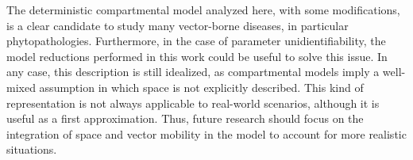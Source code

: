 The deterministic compartmental model analyzed here, with some
modifications, is a clear candidate to study many vector-borne diseases, in
particular phytopathologies. Furthermore, in the case of parameter
unidientifiability, the model reductions performed in this work could be useful
to solve this issue. In any case, this description is still idealized, as
compartmental models imply a well-mixed assumption in which space is not
explicitly described. This kind of representation is not always applicable to
real-world scenarios, although it is useful as a first approximation. Thus,
future research should focus on the integration of space and vector mobility in
the model to account for more realistic situations.